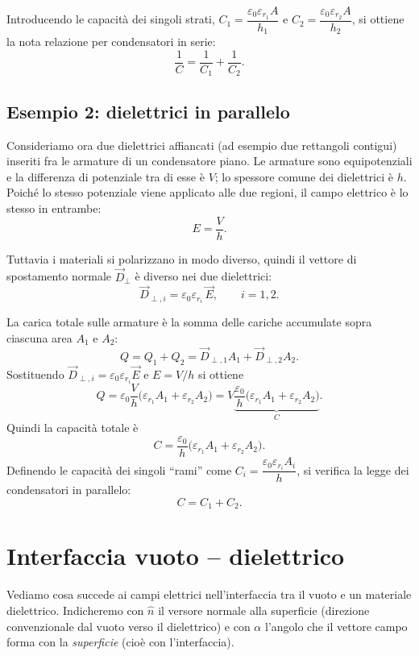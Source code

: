 \documentclass{book}
\begin{document}
Introducendo le capacità dei singoli strati, \(C_1=\dfrac{\varepsilon_0\varepsilon_{r_1} A}{h_1}\) e \(C_2=\dfrac{\varepsilon_0\varepsilon_{r_2} A}{h_2}\), si ottiene la nota relazione per condensatori in serie:
\[
\frac{1}{C}=\frac{1}{C_1}+\frac{1}{C_2}.
\]

\subsection*{Esempio 2: dielettrici in parallelo}

Consideriamo ora due dielettrici affiancati (ad esempio due rettangoli contigui) inseriti fra le armature di un condensatore piano. Le armature sono equipotenziali e la differenza di potenziale tra di esse è \(V\); lo spessore comune dei dielettrici è \(h\). Poiché lo stesso potenziale viene applicato alle due regioni, il campo elettrico è lo stesso in entrambe:
\[
E=\frac{V}{h}.
\]

Tuttavia i materiali si polarizzano in modo diverso, quindi il vettore di spostamento normale \(\vec{D}_{\perp}\) è diverso nei due dielettrici:
\[
\vec{D}_{\perp,i}=\varepsilon_0\varepsilon_{r_i}\,\vec{E},\qquad i=1,2.
\]

La carica totale sulle armature è la somma delle cariche accumulate sopra ciascuna area \(A_1\) e \(A_2\):
\[
Q=Q_1+Q_2 = \vec{D}_{\perp,1}A_1 + \vec{D}_{\perp,2}A_2.
\]
Sostituendo \(\vec{D}_{\perp,i}=\varepsilon_0\varepsilon_{r_i} \vec{E}\) e \(E=V/h\) si ottiene
\[
Q = \varepsilon_0\frac{V}{h}\bigl(\varepsilon_{r_1} A_1 + \varepsilon_{r_2} A_2\bigr)
= V\underbrace{\frac{\varepsilon_0}{h}\bigl(\varepsilon_{r_1} A_1 + \varepsilon_{r_2} A_2\bigr)}_{C}.
\]
Quindi la capacità totale è
\[
C=\frac{\varepsilon_0}{h}\bigl(\varepsilon_{r_1} A_1 + \varepsilon_{r_2} A_2\bigr).
\]
Definendo le capacità dei singoli “rami” come \(C_i=\dfrac{\varepsilon_0\varepsilon_{r_i} A_i}{h}\), si verifica la legge dei condensatori in parallelo:
\[
C = C_1 + C_2.
\]

 
\section{Interfaccia vuoto -- dielettrico}

Vediamo cosa succede ai campi elettrici nell'interfaccia tra il vuoto e un materiale dielettrico.  
Indicheremo con \(\hat{n}\) il versore normale alla superficie (direzione convenzionale dal vuoto verso il dielettrico) e con \(\alpha\) l'angolo che il vettore campo forma con la \emph{superficie} (cioè con l'interfaccia).
\end{document}
